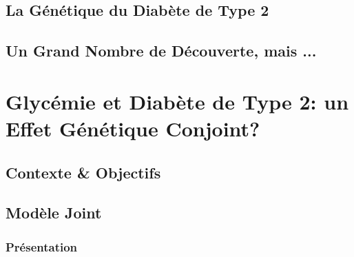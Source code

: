 \documentclass[11pt]{article} %
\begin{document}
\subsection{La Génétique du Diabète de Type 2}
\par{}

\subsection{Un Grand Nombre de Découverte, mais ...}
\par{}

\section{Glycémie et Diabète de Type 2: un Effet Génétique Conjoint?}
\par{}

\subsection{Contexte \& Objectifs}
\par{}

\subsection{Modèle Joint}
\subsubsection{Présentation}
\par{}

\par{}
\end{document}

